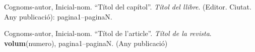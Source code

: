 \documentclass[spanish,final]{setup/eetac_tfc_pfc}
\begin{document}


%  

\cleardoublepage
{}
\begin{thebibliography}{2}


Cognoms-autor, Inicial-nom.
``Títol del capítol''. {\it Títol del llibre}.
(Editor. Ciutat. Any publicació): pagina1--paginaN.

Cognoms-autor, Inicial-nom.
``Títol de l'article''. {\it Títol de la revista}.
{\bf volum}(numero),
pagina1--paginaN. (Any publicació) 

\end{thebibliography}

\pagestyle{empty}  %

\appendix\senseportada






\end{document}
